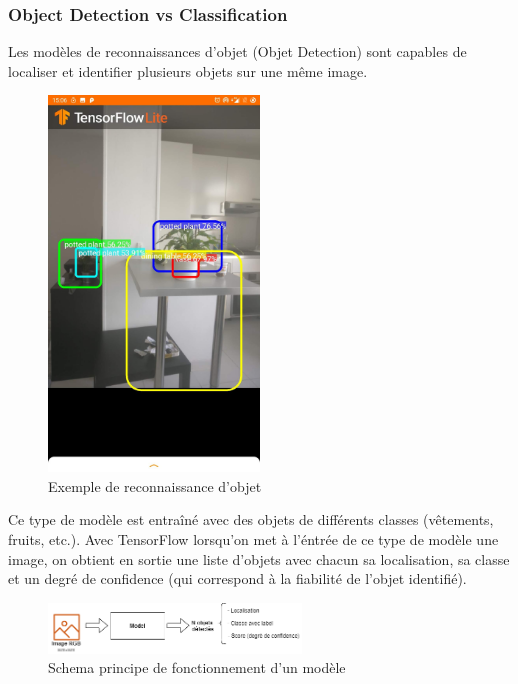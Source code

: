 \documentclass[UTF8]{EPURapport}
\begin{document}
\newpage

\subsubsection{Object Detection vs Classification}
Les modèles de reconnaissances d'objet (Objet Detection) sont capables de localiser et identifier plusieurs objets sur une même image.

\begin{figure}[h!]
\centering
  \includegraphics[width=0.5\textwidth]{images/object_detection.jpg}
  \caption{Exemple de reconnaissance d'objet}
  \label{fig:objectdetection}
\end{figure}

 Ce type de modèle est entraîné avec des objets de différents classes (vêtements, fruits, etc.). Avec TensorFlow lorsqu'on met à l'éntrée de ce type de modèle une image, on obtient en sortie une liste d'objets avec chacun sa localisation, sa classe et un degré de confidence (qui correspond à la fiabilité de l'objet identifié).

\begin{figure}[h!]
\centering
  \includegraphics[width=0.6\textwidth]{images/schema_objectDetection.png}
  \caption{Schema principe de fonctionnement d'un modèle}
  \label{fig:schema_objectdetection}
\end{figure}
\end{document}
